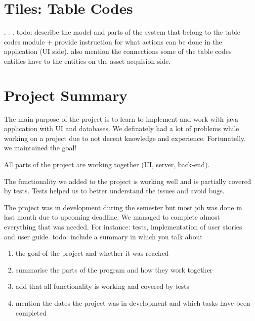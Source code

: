 \documentclass[a4paper, 12pt, final]{hitec}
\begin{document}
  \section{Tiles: Table Codes}\label{sec:06}
  .
  .
  .
  todo: describe the model and parts of the system that belong
  to the table codes module + provide instruction for what
  actions can be done in the application (UI side). also mention
  the connections some of the table codes entities have to the
  entities on the asset acquision side.
  \clearpage

  \section{Project Summary}\label{sec:07}
  The main purpose of the project is to learn to implement and work with 
  java application with UI and databases. We definately had a lot of
  problems while working on a project due to not decent knowledge and experience.
  Fortunatelly, we maintained the goal! 
  
  All parts of the project are working together (UI, server, back-end).

  The functionality we added to the project is working well and is partially covered by tests.
  Tests helped us to better understand the issues and avoid bugs.

  The project was in development during the semester but most job was done in last month
  due to upcoming deadline. We managed to complete almost everything that was needed. 
  For instance: tests, implementation of user stories and user guide. 
  todo:
  include a summary in which you talk about
  \begin{enumerate}
    \item the goal of the project and whether it was reached
    \item summarise the parts of the program and how they work together
    \item add that all functionality is working and covered by tests
    \item mention the dates the project was in development and which tasks have been completed
  \end{enumerate}
  \clearpage
\end{document}
